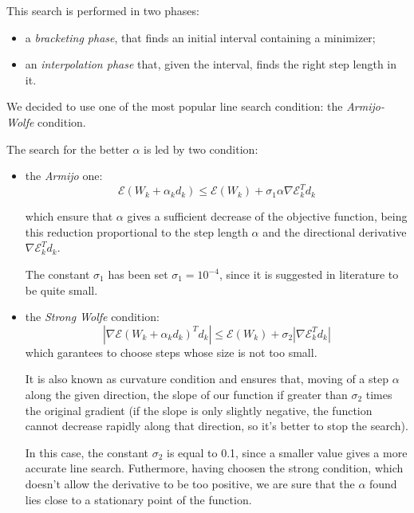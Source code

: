 			This search is performed in two phases: 
			\begin{itemize}
			\item a \textit{bracketing phase}, that finds an initial interval containing a minimizer;
			\item an \textit{interpolation phase} that, given the interval, finds the right step length in it.
			\end{itemize}

			We decided to use one of the most popular line search condition: the \textit{Armijo-Wolfe} condition.

			The search for the better $\alpha$ is led by two condition:
			\begin{itemize}
			\item the \textit{Armijo} one: 
			\begin{equation}
			\mathcal{E}(W_k+\alpha _kd_k)\leq \mathcal{E}(W_k)+\sigma_1\alpha\nabla \mathcal{E}_k^Td_k
			\end{equation}

			which ensure that $\alpha$ gives a sufficient decrease of the objective function, being this reduction proportional to the step length $\alpha$ and the directional derivative $\nabla \mathcal{E}_k^Td_k$.

			The constant $\sigma_1$ has been set $\sigma_1=10^{-4}$, since it is suggested in literature to be quite small.

			\item the \textit{Strong Wolfe} condition:
			\begin{equation}
			|\nabla \mathcal{E}(W_k+\alpha _kd_k)^Td_k|\leq \mathcal{E}(W_k)+\sigma_2|\nabla \mathcal{E}_k^Td_k|
			\end{equation}
			which garantees to choose steps whose size is not too small.

			It is also known as curvature condition and ensures that, moving of a step $\alpha$ along the given direction, the slope of our function if greater than $\sigma_2$ times the original gradient (if the slope is only slightly negative, the function cannot decrease rapidly along that direction, so it's better to stop the search).

			In this case, the constant $\sigma_2$ is equal to 0.1, since a smaller value gives a more accurate line search.
			Futhermore, having choosen the strong condition, which doesn't allow the derivative to be too positive, we are sure that the $\alpha$ found lies close to a stationary point of the function.
			\end{itemize}


